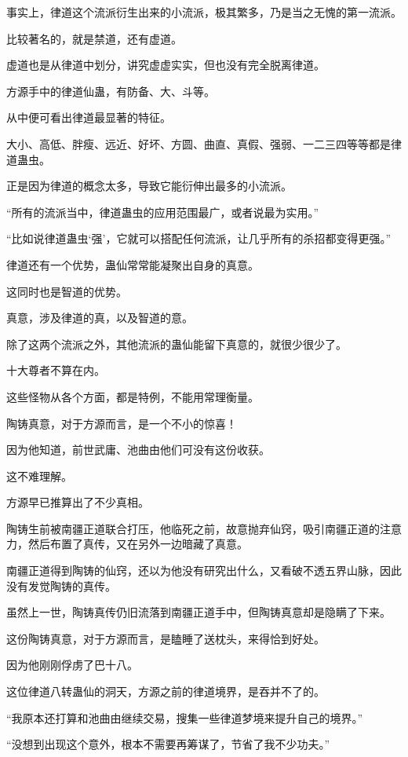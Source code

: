 \begin{this_body}
事实上，律道这个流派衍生出来的小流派，极其繁多，乃是当之无愧的第一流派。

比较著名的，就是禁道，还有虚道。

虚道也是从律道中划分，讲究虚虚实实，但也没有完全脱离律道。

方源手中的律道仙蛊，有防备、大、斗等。

从中便可看出律道最显著的特征。

大小、高低、胖瘦、远近、好坏、方圆、曲直、真假、强弱、一二三四等等都是律道蛊虫。

正是因为律道的概念太多，导致它能衍伸出最多的小流派。

“所有的流派当中，律道蛊虫的应用范围最广，或者说最为实用。”

“比如说律道蛊虫‘强’，它就可以搭配任何流派，让几乎所有的杀招都变得更强。”

律道还有一个优势，蛊仙常常能凝聚出自身的真意。

这同时也是智道的优势。

真意，涉及律道的真，以及智道的意。

除了这两个流派之外，其他流派的蛊仙能留下真意的，就很少很少了。

十大尊者不算在内。

这些怪物从各个方面，都是特例，不能用常理衡量。

陶铸真意，对于方源而言，是一个不小的惊喜！

因为他知道，前世武庸、池曲由他们可没有这份收获。

这不难理解。

方源早已推算出了不少真相。

陶铸生前被南疆正道联合打压，他临死之前，故意抛弃仙窍，吸引南疆正道的注意力，然后布置了真传，又在另外一边暗藏了真意。

南疆正道得到陶铸的仙窍，还以为他没有研究出什么，又看破不透五界山脉，因此没有发觉陶铸的真传。

虽然上一世，陶铸真传仍旧流落到南疆正道手中，但陶铸真意却是隐瞒了下来。

这份陶铸真意，对于方源而言，是瞌睡了送枕头，来得恰到好处。

因为他刚刚俘虏了巴十八。

这位律道八转蛊仙的洞天，方源之前的律道境界，是吞并不了的。

“我原本还打算和池曲由继续交易，搜集一些律道梦境来提升自己的境界。”

“没想到出现这个意外，根本不需要再筹谋了，节省了我不少功夫。”

\end{this_body}

